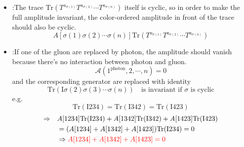 \documentclass{beamer}
\begin{document}
\begin{frame}
    \begin{itemize}
        \item {}:\quad The trace $\mathrm{Tr}(T^{a_{\sigma(1)}}T^{a_{\sigma(2)}}\cdots T^{a_{\sigma(n)}})$ itself is cyclic, so in order to make
        the full amplitude invariant, the color-ordered amplitude in front of the trace should also be cyclic.
        $$A[\sigma(1)\sigma(2)\cdots\sigma(n)]\mathrm{Tr}(T^{a_{\sigma(1)}}T^{a_{\sigma(2)}}\cdots T^{a_{\sigma(n)}})$$
        \pause
        \item {}:\quad If one of the gluon are replaced by photon, the amplitude should vanish because there's no interaction between photon and gluon.
        $$\mathcal{A}(1^{\text{photon}},2,\cdots,n)=0$$
        and the corresponding generator are replaced with identity
        $$\mathrm{Tr}(\mathrm{I}\sigma(2)\sigma(3)\cdots \sigma(n)) \quad \text{is invariant if $\sigma$ is cyclic}$$
        e.g. $$\mathrm{Tr}(\mathrm{I}234)=\mathrm{Tr}(\mathrm{I}342)=\mathrm{Tr}(\mathrm{I}423)$$
        \vspace{-2em}
        \begin{align*}
        \Rightarrow\quad &A[1234]\mathrm{Tr}(\mathrm{I}234)+A[1342]\mathrm{Tr}(\mathrm{I}342)+A[1423]\mathrm{Tr}(\mathrm{I}423)\\
            &=(A[1234]+A[1342]+A[1423])\mathrm{Tr}(\mathrm{I}234)=0   \\
            &\Rightarrow \textcolor{red}{A[1234]+A[1342]+A[1423]=0} 
        \end{align*}
    \end{itemize}
\end{frame}
\end{document}
